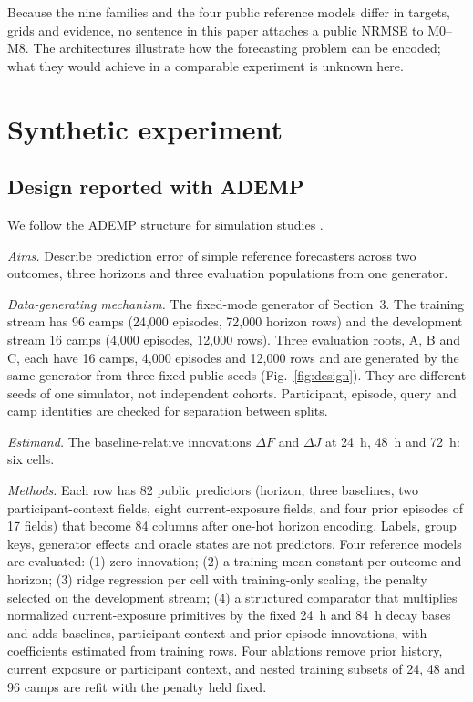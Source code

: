 \documentclass[12pt,a4paper]{article}
\newcommand{\Fig}[1]{Fig.~\ref{#1}}
\begin{document}
Because the nine families and the four public reference models differ in targets, grids and evidence, no sentence in this paper attaches a public NRMSE to M0--M8. The architectures illustrate how the forecasting problem can be encoded; what they would achieve in a comparable experiment is unknown here.

\section{Synthetic experiment}
\subsection{Design reported with ADEMP}
We follow the ADEMP structure for simulation studies \cite{Morris2019}.

\emph{Aims.} Describe prediction error of simple reference forecasters across two outcomes, three horizons and three evaluation populations from one generator.

\emph{Data-generating mechanism.} The fixed-mode generator of Section~3. The training stream has 96 camps (24,000 episodes, 72,000 horizon rows) and the development stream 16 camps (4,000 episodes, 12,000 rows). Three evaluation roots, A, B and C, each have 16 camps, 4,000 episodes and 12,000 rows and are generated by the same generator from three fixed public seeds (\Fig{fig:design}). They are different seeds of one simulator, not independent cohorts. Participant, episode, query and camp identities are checked for separation between splits.

\emph{Estimand.} The baseline-relative innovations $\Delta F$ and $\Delta J$ at \SI{24}{\hour}, \SI{48}{\hour} and \SI{72}{\hour}: six cells.

\emph{Methods.} Each row has 82 public predictors (horizon, three baselines, two participant-context fields, eight current-exposure fields, and four prior episodes of 17 fields) that become 84 columns after one-hot horizon encoding. Labels, group keys, generator effects and oracle states are not predictors. Four reference models are evaluated: (1) zero innovation; (2) a training-mean constant per outcome and horizon; (3) ridge regression \cite{Hoerl1970} per cell with training-only scaling, the penalty selected on the development stream; (4) a structured comparator that multiplies normalized current-exposure primitives by the fixed \SI{24}{\hour} and \SI{84}{\hour} decay bases and adds baselines, participant context and prior-episode innovations, with coefficients estimated from training rows. Four ablations remove prior history, current exposure or participant context, and nested training subsets of 24, 48 and 96 camps are refit with the penalty held fixed.
\end{document}
